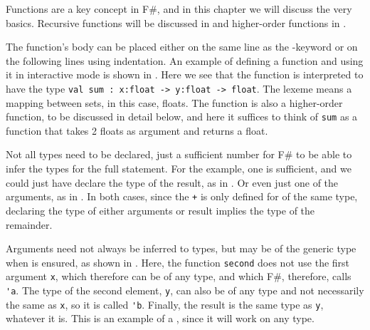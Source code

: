 \documentclass[fsharpNotes.tex]{subfiles}
\begin{document}
Functions are a key concept in F\#, and in this chapter we will discuss the very basics. Recursive functions will be discussed in  and higher-order functions in .

The function's body can be placed either on the same line as the -keyword or on the following lines using indentation. An example of defining a function and using it in interactive mode is shown in .
%
%
Here we see that the function is interpreted to have the type \lstinline!val sum : x:float -> y:float -> float!. The \lexeme{->} lexeme means a mapping between sets, in this case, floats. The function is also a higher-order function, to be discussed in detail below, and here it suffices to think of \lstinline!sum! as a function that takes 2 floats as argument and returns a float.

Not all types need to be declared, just a sufficient number for F\# to be able to infer the types for the full statement. For the example, one is sufficient, and we could just have declare the type of the result, as in .
%
%
Or even just one of the arguments, as in .
%
%
In both cases, since the \lstinline|+|  is only defined for  of the same type, declaring the type of either arguments or result implies the type of the remainder.

Arguments need not always be inferred to types, but may be of the generic type when  is ensured, as shown in .
%
%
Here, the function \lstinline{second} does not use the first argument \lstinline{x}, which therefore can be of any type, and which F\#, therefore, calls \lstinline{'a}. The type of the second element, \lstinline{y}, can also be of any type and not necessarily the same as \lstinline!x!, so it is called \lstinline!'b!. Finally, the result is the same type as \lstinline!y!, whatever it is. This is an example of a , since it will work on any type.
\end{document}
